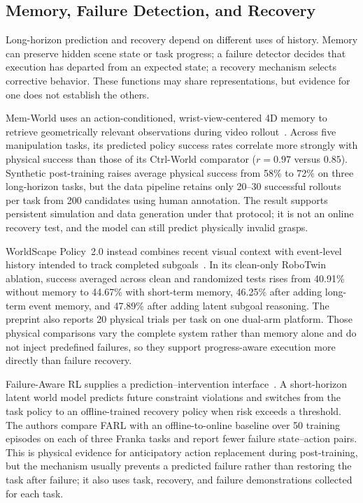 \subsection{Memory, Failure Detection, and Recovery}
Long-horizon prediction and recovery depend on different uses of history. Memory can preserve hidden scene state or task progress; a failure detector decides that execution has departed from an expected state; a recovery mechanism selects corrective behavior. These functions may share representations, but evidence for one does not establish the others.

Mem-World uses an action-conditioned, wrist-view-centered 4D memory to retrieve geometrically relevant observations during video rollout~\cite{zheng2026memworld}. Across five manipulation tasks, its predicted policy success rates correlate more strongly with physical success than those of its Ctrl-World comparator ($r=0.97$ versus $0.85$). Synthetic post-training raises average physical success from 58\% to 72\% on three long-horizon tasks, but the data pipeline retains only 20--30 successful rollouts per task from 200 candidates using human annotation. The result supports persistent simulation and data generation under that protocol; it is not an online recovery test, and the model can still predict physically invalid grasps.

WorldScape Policy~2.0 instead combines recent visual context with event-level history intended to track completed subgoals~\cite{su2026worldscape2}. In its clean-only RoboTwin ablation, success averaged across clean and randomized tests rises from 40.91\% without memory to 44.67\% with short-term memory, 46.25\% after adding long-term event memory, and 47.89\% after adding latent subgoal reasoning. The preprint also reports 20 physical trials per task on one dual-arm platform. Those physical comparisons vary the complete system rather than memory alone and do not inject predefined failures, so they support progress-aware execution more directly than failure recovery.

Failure-Aware RL supplies a prediction--intervention interface~\cite{li2026farl}. A short-horizon latent world model predicts future constraint violations and switches from the task policy to an offline-trained recovery policy when risk exceeds a threshold. The authors compare FARL with an offline-to-online baseline over 50 training episodes on each of three Franka tasks and report fewer failure state--action pairs. This is physical evidence for anticipatory action replacement during post-training, but the mechanism usually prevents a predicted failure rather than restoring the task after failure; it also uses task, recovery, and failure demonstrations collected for each task.

